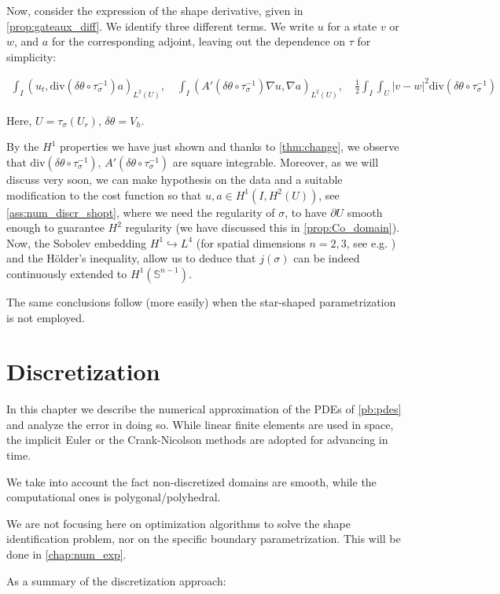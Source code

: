 \documentclass[english,a4paper,9pt,oneside]{scrbook}	%
\theoremstyle{break}
\theoremstyle{remark}
\newcommand{\mS}{\mathbb{S}^{n-1}}
\newcommand{\emb}{\hookrightarrow}
\newcommand{\te}{\theta}
\newcommand{\dive}{\text{div}}
\begin{document}
Now, consider the expression of the shape derivative, given in \cref{prop:gateaux_diff}. We identify three different terms. We write $u$ for a state $v$ or $w$, and $a$ for the corresponding adjoint, leaving out the dependence on $\tau$ for simplicity:

\begin{align*}
\int_I (u_t , \dive(\delta \te \circ \tau_\sigma^{-1}) a)_{L^2(U)}, \quad \int_I (A'(\delta\te\circ \tau_\sigma^{-1} )\nabla u, \nabla a)_{L^2(U)}, \quad \frac{1}{2}\int_I\int_{U} |v-w|^2\dive(\delta \te\circ \tau_\sigma^{-1})
\end{align*}

Here, $U = \tau_\sigma(U_r)$, $\delta \te = V_h$.

By the $H^1$ properties we have just shown and thanks to \cref{thm:change}, we observe that $\dive(\delta \te\circ \tau_\sigma^{-1})$, $A'(\delta\te\circ \tau_\sigma^{-1} )$ are square integrable. Moreover, as we will discuss very soon, we can make hypothesis on the data and a suitable modification to the cost function so that $u, a \in H^1(I, H^2(U))$, see \cref{ass:num_discr_shopt}, where we need the regularity of $\sigma$, to have $\partial U$ smooth enough to guarantee $H^2$ regularity (we have discussed this in \cref{prop:Co_domain}). Now, the Sobolev embedding $H^1\emb L^4$ (for spatial dimensions $n=2,3$, see e.g. \cite{adams}) and the Hölder's inequality, allow us to deduce that $j(\sigma)$ can be indeed continuously extended to $H^1(\mS)$. 

The same conclusions follow (more easily) when the star-shaped parametrization is not employed.


\chapter{Discretization}
\label{chap:discretization}
In this chapter we describe the numerical approximation of the PDEs of \cref{pb:pdes} and analyze the error in doing so. While linear finite elements are used in space, the implicit Euler or the Crank-Nicolson methods are adopted for advancing in time.

We take into account the fact non-discretized domains are smooth, while the computational ones is polygonal/polyhedral. 

We are not focusing here on optimization algorithms to solve the shape identification problem, nor on the specific boundary parametrization. This will be done in \cref{chap:num_exp}.


As a summary of the discretization approach:
\end{document}
